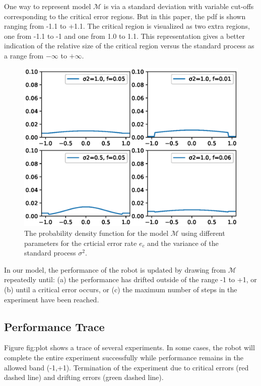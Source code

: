 \documentclass[runningheads]{llncs}
\begin{document}
One way to represent model $\mathcal{M}$ is via a standard deviation with variable cut-offs corresponding to the critical error regions. 
But in this paper, the pdf is shown ranging from -1.1 to +1.1.
The critical region is visualized as two extra regions, one from -1.1 to -1 and one from 1.0 to 1.1.
This representation gives a better indication of the relative size of the critical region versus the standard process as a range from $-\infty$ to $+\infty$.

\begin{figure}
\includegraphics[width=\textwidth]{Figures/pdf2.eps}
\caption{The probability density function for the model $\mathcal{M}$ using different parameters for the crticial error rate $e_c$ and the variance of the standard process $\sigma^2$.} 
\label{fig:pdf}
\end{figure}

In our model, the performance of the robot is updated by drawing from $\mathcal{M}$ repeatedly until: (a) the performance has drifted outside of the range -1 to +1, or (b) until a critical error occurs, or (c) the maximum number of steps in the experiment have been reached.

\subsection{Performance Trace}

Figure {fig:plot} shows a trace of several experiments.
In some cases, the robot will complete the entire experiment successfully while performance remains in the allowed band (-1,+1). Termination of the experiment due to critical errors (red dashed line) and drifting errors (green dashed line).
\end{document}
